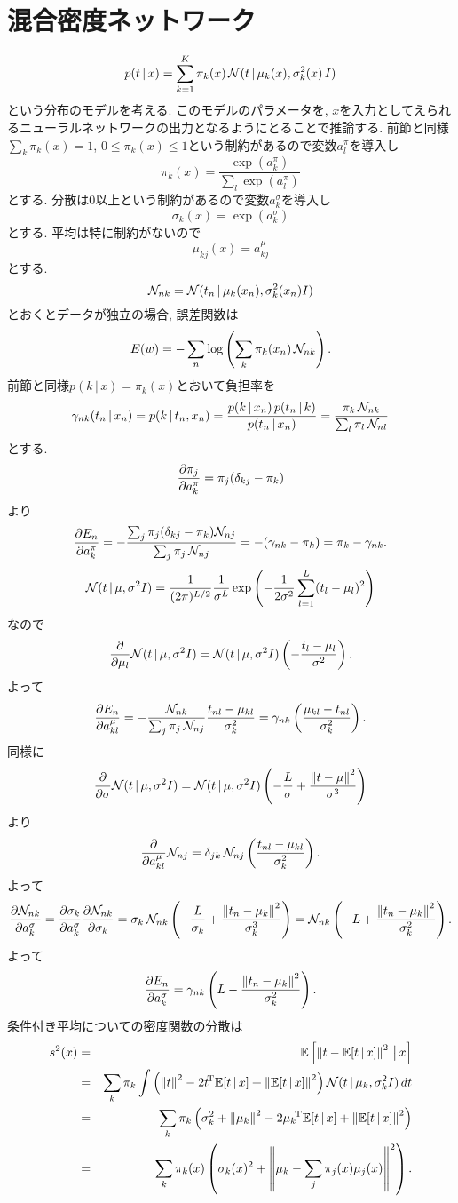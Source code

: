 \section{混合密度ネットワーク}
$$
p(t\,|\,x)=\sum_{k=1}^K \pi_k(x)\,\calN(t\,|\,\mu_k(x),\sigma_k^2(x)\,I)
$$
という分布のモデルを考える.
このモデルのパラメータを, $x$を入力としてえられるニューラルネットワークの出力となるようにとることで推論する.
前節と同様$\sum_k \pi_k(x)=1$, $0 \le \pi_k(x) \le 1$という制約があるので変数$a_l^\pi$を導入し
$$
\pi_k(x)=\frac{\exp(a_k^\pi)}{\sum_l \exp(a_l^\pi)}
$$
とする. 分散は$0$以上という制約があるので変数$a_k^\sigma$を導入し
$$
\sigma_k(x)=\exp(a_k^\sigma)
$$
とする. 平均は特に制約がないので
$$
\mu_{kj}(x)=a_{kj}^\mu
$$
とする.
$$
\calN_{nk}=\calN(t_n\,|\,\mu_k(x_n), \sigma_k^2(x_n)I)
$$
とおくとデータが独立の場合, 誤差関数は
$$
E(w)=-\sum_n \log \left(\sum_k \pi_k(x_n)\,\calN_{nk} \right).
$$
前節と同様$p(k\,|\,x)=\pi_k(x)$とおいて負担率を
$$
\gamma_{nk}(t_n\,|\,x_n)=p(k\,|\,t_n,x_n)=\frac{p(k\,|\,x_n)\,p(t_n\,|\,k)}{p(t_n\,|\,x_n)}=\frac{\pi_k\, \calN_{nk}}{\sum_l \pi_l\,\calN_{nl}}
$$
とする.
$$
\diff{a_k^\pi}{\pi_j}=\pi_j(\delta_{kj}-\pi_k)
$$
より
$$
\diff{a_k^\pi}{E_n}
 =-\frac{\sum_j \pi_j(\delta_{kj}-\pi_k)\calN_{nj}}{\sum_j \pi_j\, \calN_{nj}}
 =-(\gamma_{nk}-\pi_k)
 =\pi_k - \gamma_{nk}.
$$
$$
\calN(t\,|\,\mu,\sigma^2 I) =\frac{1}{(2\pi)^{L/2}}\frac{1}{\sigma^L}\exp\left(-\frac{1}{2\sigma^2}\sum_{l=1}^L(t_l-\mu_l)^2\right)
$$
なので
$$
\dif{\mu_l}\calN(t\,|\,\mu,\sigma^2 I)
 = \calN(t\,|\,\mu,\sigma^2 I)\left(-\frac{t_l-\mu_l}{\sigma^2}\right).
$$
よって
$$
\diff{a_{kl}^\mu}{E_n}
 =-\frac{\calN_{nk}}{\sum_j \pi_j\, \calN_{nj}}\frac{t_{nl}-\mu_{kl}}{\sigma_k^2}
 =\gamma_{nk}\left(\frac{\mu_{kl}-t_{nl}}{\sigma_k^2}\right).
$$
同様に
$$
\dif{\sigma}\calN(t\,|\,\mu,\sigma^2 I)
 = \calN(t\,|\,\mu,\sigma^2 I)\left(-\frac{L}{\sigma} + \frac{\Norm{t-\mu}^2}{\sigma^3}\right)
$$
より
$$
\dif{a_{kl}^\mu}\calN_{nj}=\delta_{jk}\,\calN_{nj}\left(\frac{t_{nl}-\mu_{kl}}{\sigma_k^2}\right).
$$
よって
$$
\diff{a_k^\sigma}{\calN_{nk}}
 =\diff{a_k^\sigma}{\sigma_k}\diff{\sigma_k}{\calN_{nk}}
 =\sigma_k\, \calN_{nk}\left(-\frac{L}{\sigma_k} + \frac{\Norm{t_n-\mu_k}^2}{\sigma_k^3}\right)
 =\calN_{nk}\left(-L + \frac{\Norm{t_n-\mu_k}^2}{\sigma_k^2}\right).
$$
よって
$$
\diff{a_k^\sigma}{E_n}=\gamma_{nk}\left(L-\frac{\Norm{t_n-\mu_k}^2}{\sigma_k^2}\right).
$$
条件付き平均についての密度関数の分散は
\begin{eqnarray*}
s^2(x)
 &=& \EE\left[\Norm{t-\EE[t\,|\,x]}^2\,\big|\,x\right]\\
 &=& \sum_k \pi_k \int \left(\Norm{t}^2-2\trans{t}\EE[t\,|\,x]+\Norm{\EE[t\,|\,x]}^2\right)\calN(t\,|\,\mu_k,\sigma_k^2 I)\,dt\\
 &=& \sum_k \pi_k \left(\sigma_k^2+\Norm{\mu_k}^2-2\trans{\mu_k}\EE[t\,|\,x]+\Norm{\EE[t\,|\,x]}^2\right)\\
 &=& \sum_k \pi_k(x)\left(\sigma_k(x)^2+\Norm{\mu_k-\sum_j \pi_j(x)\mu_j(x)}^2\right).
\end{eqnarray*}
\vspace{0pt}

